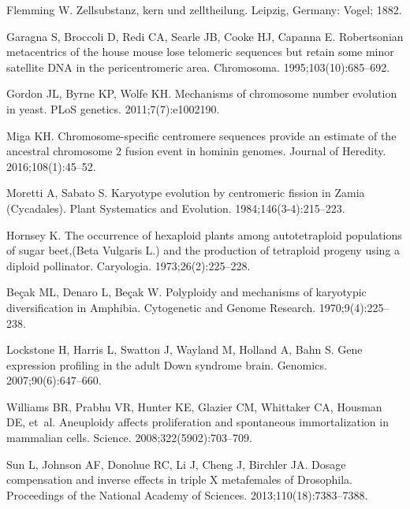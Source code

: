 \documentclass[]{rsos}%
\begin{document}
\noindent 


\begin{thebibliography}{9}

Flemming W. 
Zellsubstanz, kern und zelltheilung. Leipzig, Germany: Vogel; 1882.

Garagna S, Broccoli D, Redi CA, Searle JB, Cooke HJ, Capanna E.
 Robertsonian metacentrics of the house mouse lose telomeric sequences
  but retain some minor satellite DNA in the pericentromeric area.
 Chromosoma. 1995;103(10):685--692.

Gordon JL, Byrne KP, Wolfe KH.
 Mechanisms of chromosome number evolution in yeast.
 PLoS genetics. 2011;7(7):e1002190.

Miga KH.
 Chromosome-specific centromere sequences provide an estimate of the
  ancestral chromosome 2 fusion event in hominin genomes.
 Journal of Heredity. 2016;108(1):45--52.

Moretti A, Sabato S.
 Karyotype evolution by centromeric fission in Zamia (Cycadales).
 Plant Systematics and Evolution. 1984;146(3-4):215--223.

Hornsey K.
 The occurrence of hexaploid plants among autotetraploid populations
  of sugar beet,(Beta Vulgaris L.) and the production of tetraploid progeny
  using a diploid pollinator.
 Caryologia. 1973;26(2):225--228.

Be{\c{c}}ak ML, Denaro L, Be{\c{c}}ak W.
 Polyploidy and mechanisms of karyotypic diversification in Amphibia.
 Cytogenetic and Genome Research. 1970;9(4):225--238.

Lockstone H, Harris L, Swatton J, Wayland M, Holland A, Bahn S.
 Gene expression profiling in the adult Down syndrome brain.
 Genomics. 2007;90(6):647--660.

Williams BR, Prabhu VR, Hunter KE, Glazier CM, Whittaker CA, Housman DE, et~al.
 Aneuploidy affects proliferation and spontaneous immortalization in
  mammalian cells.
 Science. 2008;322(5902):703--709.

Sun L, Johnson AF, Donohue RC, Li J, Cheng J, Birchler JA.
 Dosage compensation and inverse effects in triple X metafemales of
  Drosophila.
 Proceedings of the National Academy of Sciences.
  2013;110(18):7383--7388.


\end{thebibliography}
\end{document}
